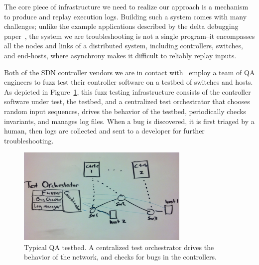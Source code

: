 The core piece of infrastructure we need to realize our approach is a
mechanism to produce and replay execution logs. Building such a system comes
with many challenges; unlike the example applications described
by the delta debugging paper~\cite{Zeller:1999:YMP:318773.318946}, the system we are troubleshooting is not a
single program--it encompasses all the nodes and links of a distributed system,
including controllers, switches, and end-hosts, where asynchrony
makes it difficult to reliably replay inputs.

Both of the SDN controller vendors we are in contact with~\cite{nicirahomepage,bigswitch} employ a team of QA
engineers to fuzz test their controller software on a testbed of switches and hosts.
As depicted in Figure~\ref{fig:qa_cluster}, this fuzz testing infrastructure
consists of the controller software under test, the testbed, and a centralized
test orchestrator
that chooses random input sequences, drives the behavior of the testbed,
periodically checks invariants, and manages log files. When a bug is discovered, it is first triaged
by a human, then logs are collected and sent to a developer for further troubleshooting.

\begin{figure}[t]
    \includegraphics[width=3.25in]{../diagrams/architecture/qa_cluster.jpg}
    \caption[]{\label{fig:qa_cluster} Typical QA testbed. A centralized test
    orchestrator drives the behavior of the network, and checks for bugs in
    the controllers.}
\end{figure}

